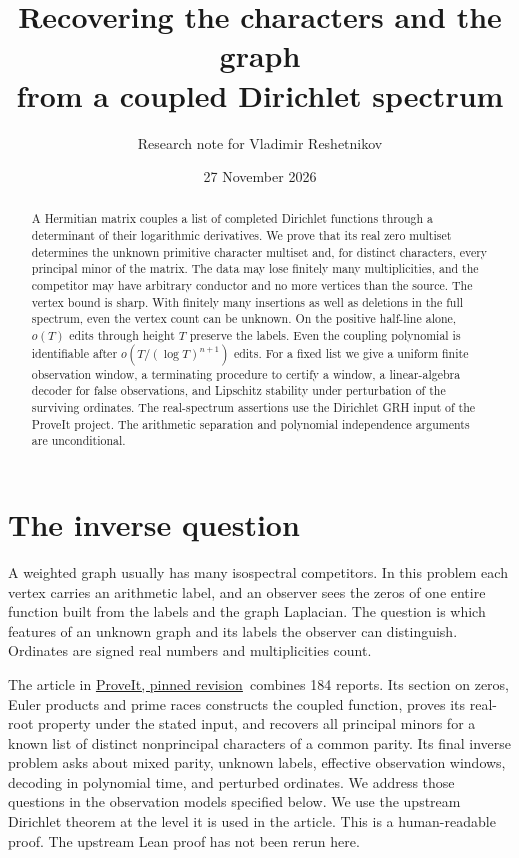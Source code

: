 \documentclass[11pt]{article}
\title{Recovering the characters and the graph\\from a coupled Dirichlet spectrum}
\author{Research note for Vladimir Reshetnikov}
\date{27 November 2026}
\theoremstyle{remark}\newtheorem{remark}[theorem]{Remark}
\newcommand{\repo}{\href{https://github.com/VladimirReshetnikov/ProveIt/tree/00cadb961bbe77c74e5d082c4948f8884d58a970/Analysis/GeneralizedRiemannHypothesis}{ProveIt, pinned revision}}
\begin{document}
\maketitle
\begin{abstract}
A Hermitian matrix couples a list of completed Dirichlet functions through a determinant of their logarithmic derivatives. We prove that its real zero multiset determines the unknown primitive character multiset and, for distinct characters, every principal minor of the matrix. The data may lose finitely many multiplicities, and the competitor may have arbitrary conductor and no more vertices than the source. The vertex bound is sharp. With finitely many insertions as well as deletions in the full spectrum, even the vertex count can be unknown. On the positive half-line alone, $o(T)$ edits through height $T$ preserve the labels. Even the coupling polynomial is identifiable after $o(T/(\log T)^{n+1})$ edits. For a fixed list we give a uniform finite observation window, a terminating procedure to certify a window, a linear-algebra decoder for false observations, and Lipschitz stability under perturbation of the surviving ordinates. The real-spectrum assertions use the Dirichlet GRH input of the ProveIt project. The arithmetic separation and polynomial independence arguments are unconditional.
\end{abstract}

\section{The inverse question}
A weighted graph usually has many isospectral competitors. In this problem each vertex carries an arithmetic label, and an observer sees the zeros of one entire function built from the labels and the graph Laplacian. The question is which features of an unknown graph and its labels the observer can distinguish. Ordinates are signed real numbers and multiplicities count.

The article in \repo\ combines 184 reports. Its section on zeros, Euler products and prime races constructs the coupled function, proves its real-root property under the stated input, and recovers all principal minors for a known list of distinct nonprincipal characters of a common parity. Its final inverse problem asks about mixed parity, unknown labels, effective observation windows, decoding in polynomial time, and perturbed ordinates. We address those questions in the observation models specified below. We use the upstream Dirichlet theorem at the level it is used in the article. This is a human-readable proof. The upstream Lean proof has not been rerun here.
\end{document}
